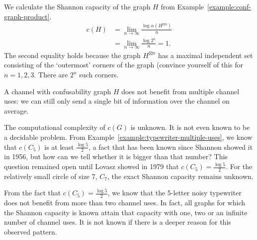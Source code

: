 \begin{example}
We calculate the Shannon capacity of the graph $H$ from Example~\ref{example:conf-graph-product}.
\begin{align*}
c(H) &=  \lim_{n \to \infty} \frac{\log \alpha(H^{\boxtimes n})}{n}\\
&= \lim_{n \to \infty} \frac{\log 2^n}{n} = 1.
\end{align*}
The second equality holds because the graph $H^{\boxtimes n}$ has a maximal independent set consisting of the `outermost' corners of the graph (convince yourself of this for $n = 1, 2, 3$. There are $2^n$ such corners.

A channel with confusability graph $H$ does not benefit from multiple channel uses: we can still only send a single bit of information over the channel on average.
\end{example}

The computational complexity of $c(G)$ is unknown. It is not even known to be a decidable problem. From Example~\ref{example:typewriter-multiple-uses}, we know that $c(C_5)$ is at least $\frac{\log 5}{2}$, a fact that has been known since Shannon showed it in 1956, but how can we tell whether it is bigger than that number? This question remained open until Lovasz showed in 1979 that $c(C_5) = \frac{\log 5}{2}$. For the relatively small circle of size 7, $C_7$, the exact Shannon capacity remains unknown.

From the fact that $c(C_5) = \frac{\log 5}{2}$, we know that the 5-letter noisy typewriter does not benefit from more than two channel uses. In fact, all graphs for which the Shannon capacity is known attain that capacity with one, two or an infinite number of channel uses. It is not known if there is a deeper reason for this observed pattern.